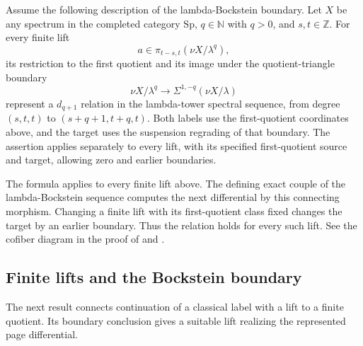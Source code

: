 \begin{theorem}
\label{sem:Literature:lambda-geometric-boundary-input}
Assume the following description of the lambda-Bockstein boundary.
Let $X$ be any spectrum in the completed category $\mathrm{Sp}$,
$q\in\mathbb N$ with $q>0$, and
$s,t\in\mathbb Z$. For every finite lift
\[
 a\in\pi_{t-s,t}(\nu X/\lambda^q),
\]
its restriction to the first quotient and its image under the
quotient-triangle boundary
\[
 \nu X/\lambda^q\longrightarrow\Sigma^{1,-q}(\nu X/\lambda)
\]
represent a $d_{q+1}$ relation in the lambda-tower spectral sequence,
from degree $(s,t,t)$ to $(s+q+1,t+q,t)$. Both labels use the
first-quotient coordinates above, and the target uses the
suspension regrading of that boundary. The assertion applies separately to every lift, with its specified
first-quotient source and target, allowing zero and earlier boundaries.

The formula applies to every finite lift above. The defining exact couple of the lambda-Bockstein sequence computes the
next differential by this connecting morphism. Changing a finite lift
with its first-quotient class fixed changes the target by an earlier
boundary. Thus the relation holds for every such lift. See the cofiber
diagram in the proof of
\cite[Theorem 9.19(1)]{BHS} and \cite[Theorem 3.8]{LWX126}.
\end{theorem}

\subsection{Finite lifts and the Bockstein boundary}
The next result connects continuation of a classical label with a lift to
a finite quotient. Its boundary conclusion gives a suitable lift realizing the represented
page differential.

